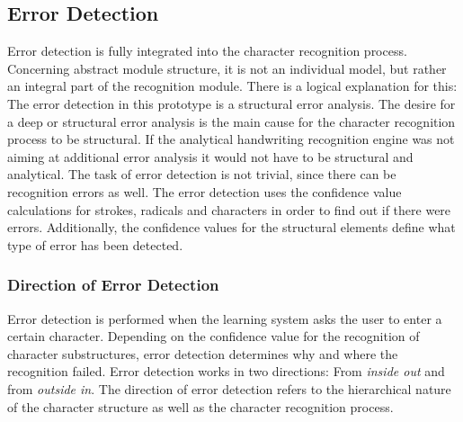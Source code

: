 \subsection{Error Detection}
\label{sec:hwre:errordetection}





Error detection is fully integrated into the character recognition process.
Concerning abstract module structure, it is not an individual model, but rather
an integral part of the recognition module.
There is a logical explanation for this: The error detection in this 
prototype is a structural error analysis. The desire for a deep or structural 
error analysis is the main cause for the character recognition process 
to be structural. If the analytical handwriting recognition engine was not
aiming at additional error analysis it would not have to be structural
and analytical.
The task of error detection is not trivial, since there can be recognition errors
as well. The error detection uses the confidence value calculations for strokes, 
radicals and characters in order to find out if there were errors. 
Additionally, the confidence values for the structural elements define 
what type of error has been detected.

\subsubsection{Direction of Error Detection}
\label{sec:hwre:directionoferrordetection}

Error detection is performed when the learning system asks the user to enter a
certain character. Depending on the confidence value for the recognition of 
character substructures, error detection determines why and where the 
recognition failed. Error detection works in two directions:
From \emph{inside out} and from \emph{outside in}. 
The direction of error detection refers to the hierarchical nature of the 
character structure as well as the character recognition process.

